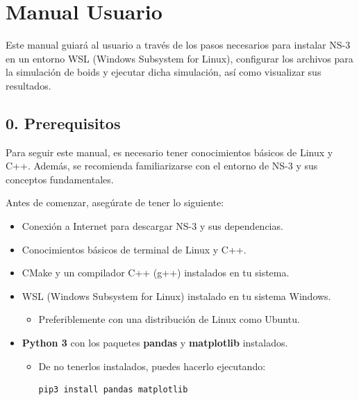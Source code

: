 \documentclass{article}
\begin{document}
\section{Manual Usuario}\label{sec:man_u}

Este manual guiará al usuario a través de los pasos necesarios para instalar NS-3 en un entorno WSL (Windows Subsystem for Linux), configurar los archivos para la simulación de boids y ejecutar dicha simulación, así como visualizar sus resultados.

\subsection*{\textbf{0. Prerequisitos}}

Para seguir este manual, es necesario tener conocimientos básicos de Linux y C++. Además, se recomienda familiarizarse con el entorno de NS-3 y sus conceptos fundamentales.


Antes de comenzar, asegúrate de tener lo siguiente:
\begin{itemize}
    \item Conexión a Internet para descargar NS-3 y sus dependencias.
    \item Conocimientos básicos de terminal de Linux y C++.
    \item CMake y un compilador C++ (g++) instalados en tu sistema.
    \item WSL (Windows Subsystem for Linux) instalado en tu sistema Windows.
        \begin{itemize}
            \item Preferiblemente con una distribución de Linux como Ubuntu.
        \end{itemize}
    \item \textbf{Python 3} con los paquetes \textbf{pandas} y \textbf{matplotlib} instalados.
        \begin{itemize}
            \item De no tenerlos instalados, puedes hacerlo ejecutando:
            \begin{lstlisting}
pip3 install pandas matplotlib
            \end{lstlisting}
        \end{itemize}
\end{itemize}
\end{document}
